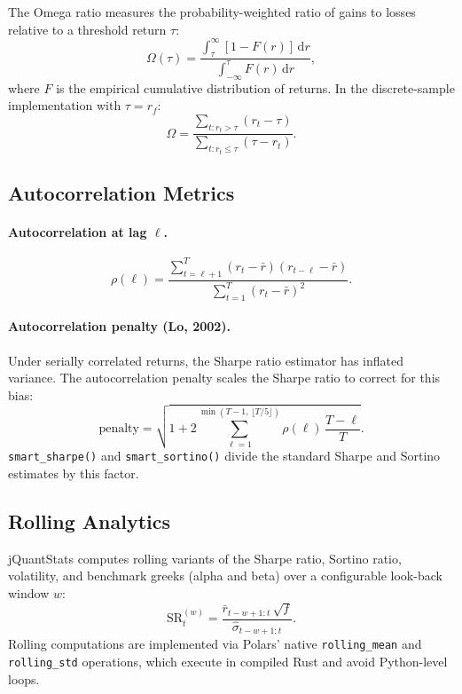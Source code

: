 \documentclass[11pt,a4paper]{article}
\begin{document}
The Omega ratio \citep{keating2002} measures the probability-weighted ratio of
gains to losses relative to a threshold return $\tau$:
\begin{equation}
  \Omega(\tau) = \frac{\int_\tau^\infty [1 - F(r)]\,\mathrm{d}r}
                      {\int_{-\infty}^\tau F(r)\,\mathrm{d}r},
\end{equation}
where $F$ is the empirical cumulative distribution of returns.  In the
discrete-sample implementation with $\tau = r_f$:
\begin{equation}
  \Omega = \frac{\sum_{t : r_t > \tau}(r_t - \tau)}
                {\sum_{t : r_t \leq \tau}(\tau - r_t)}.
\end{equation}

\subsection{Autocorrelation Metrics}

\paragraph{Autocorrelation at lag $\ell$.}
\begin{equation}
  \rho(\ell) = \frac{\sum_{t=\ell+1}^{T}(r_t - \bar{r})(r_{t-\ell} - \bar{r})}
                    {\sum_{t=1}^{T}(r_t - \bar{r})^2}.
\end{equation}

\paragraph{Autocorrelation penalty (Lo, 2002).}
Under serially correlated returns, the Sharpe ratio estimator has inflated
variance.  The autocorrelation penalty scales the Sharpe ratio to correct for
this bias:
\begin{equation}
  \text{penalty} = \sqrt{1 + 2\sum_{\ell=1}^{\min(T-1,\,\lfloor T/5\rfloor)}
    \rho(\ell)\,\frac{T - \ell}{T}}.
\end{equation}
\texttt{smart\_sharpe()} and \texttt{smart\_sortino()} divide the standard
Sharpe and Sortino estimates by this factor.

\subsection{Rolling Analytics}

jQuantStats computes rolling variants of the Sharpe ratio, Sortino ratio,
volatility, and benchmark greeks (alpha and beta) over a configurable
look-back window $w$:
\begin{equation}
  \mathrm{SR}_t^{(w)} = \frac{\bar{r}_{t-w+1:t}\,\sqrt{f}}
                              {\hat\sigma_{t-w+1:t}}.
\end{equation}
Rolling computations are implemented via Polars' native
\texttt{rolling\_mean} and \texttt{rolling\_std} operations, which execute in
compiled Rust and avoid Python-level loops.
\end{document}
